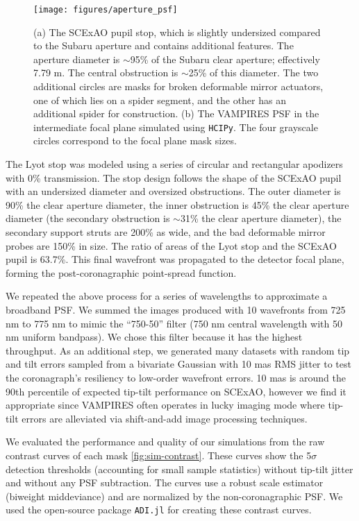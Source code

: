 \documentclass[]{spie}  %
\begin{document}
\begin{figure}
   \centering
   \texttt{[image: figures/aperture\_psf]}
   \caption{(a) The SCExAO pupil stop, which is slightly undersized compared to the Subaru aperture and contains additional features. The aperture diameter is $\sim$95\% of the Subaru clear aperture; effectively 7.79 m. The central obstruction is $\sim$25\% of this diameter. The two additional circles are masks for broken deformable mirror actuators, one of which lies on a spider segment, and the other has an additional spider for construction. (b) The VAMPIRES PSF in the intermediate focal plane simulated using \texttt{HCIPy}. The four grayscale circles correspond to the focal plane mask sizes.}\label{fig:pupil}
\end{figure}

The Lyot stop was modeled using a series of circular and rectangular apodizers with 0\% transmission. The stop design follows the shape of the SCExAO pupil with an undersized diameter and oversized obstructions. The outer diameter is 90\% the clear aperture diameter, the inner obstruction is 45\% the clear aperture diameter (the secondary obstruction is $\sim$31\% the clear aperture diameter), the secondary support struts are 200\% as wide, and the bad deformable mirror probes are 150\% in size. The ratio of areas of the Lyot stop and the SCExAO pupil is 63.7\%. This final wavefront was propagated to the detector focal plane, forming the post-coronagraphic point-spread function.

We repeated the above process for a series of wavelengths to approximate a broadband PSF. We summed the images produced with 10 wavefronts from 725 nm to 775 nm to mimic the ``750-50'' filter (750 nm central wavelength with 50 nm uniform bandpass). We chose this filter because it has the highest throughput. As an additional step, we generated many datasets with random tip and tilt errors sampled from a bivariate Gaussian with 10 mas RMS jitter to test the coronagraph's resiliency to low-order wavefront errors. 10 mas is around the 90th percentile of expected tip-tilt performance on SCExAO, however we find it appropriate since VAMPIRES often operates in lucky imaging mode where tip-tilt errors are alleviated via shift-and-add image processing techniques.

We evaluated the performance and quality of our simulations from the raw contrast curves of each mask \autoref{fig:sim-contrast}. These curves show the 5$\sigma$ detection thresholds (accounting for small sample statistics\cite{mawet2014}) without tip-tilt jitter and without any PSF subtraction. The curves use a robust scale estimator (biweight middeviance) and are normalized by the non-coronagraphic PSF. We used the open-source package \texttt{ADI.jl}\cite{lucas2020} for creating these contrast curves.
\end{document}
